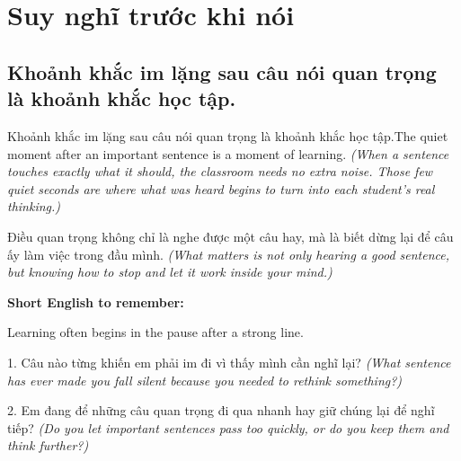 \chapter{Suy nghĩ trước khi nói}


\section{Khoảnh khắc im lặng sau câu nói quan trọng là khoảnh khắc học tập.}
\begin{truyen}{Khoảnh khắc im lặng sau câu nói quan trọng là khoảnh khắc học tập.}{The quiet moment after an important sentence is a moment of learning.}
\textit{(When a sentence touches exactly what it should, the classroom needs no extra noise. Those few quiet seconds are where what was heard begins to turn into each student's real thinking.)}
\end{truyen}

\begin{baihoc}
Điều quan trọng không chỉ là nghe được một câu hay, mà là biết dừng lại để câu ấy làm việc trong đầu mình.
\textit{(What matters is not only hearing a good sentence, but knowing how to stop and let it work inside your mind.)}
\end{baihoc}

\begin{ghinhoanh}
\textbf{Short English to remember:}

Learning often begins in the pause after a strong line.

\end{ghinhoanh}

\begin{tuhocnhanh}
1. Câu nào từng khiến em phải im đi vì thấy mình cần nghĩ lại? \textit{(What sentence has ever made you fall silent because you needed to rethink something?)}

2. Em đang để những câu quan trọng đi qua nhanh hay giữ chúng lại để nghĩ tiếp? \textit{(Do you let important sentences pass too quickly, or do you keep them and think further?)}
\end{tuhocnhanh}
\ngancach


